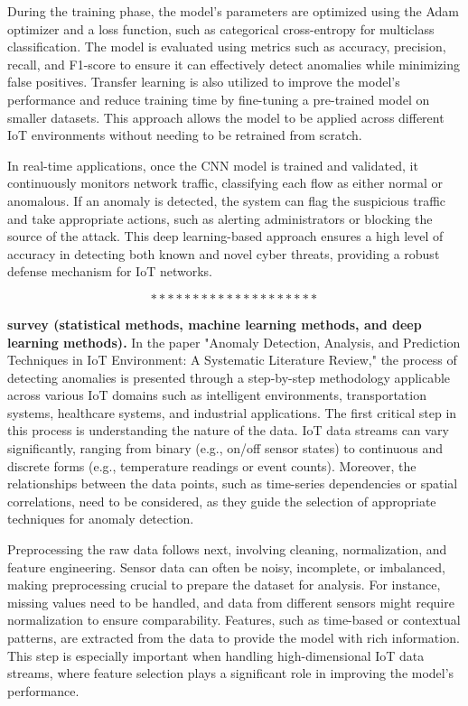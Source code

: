 During the training phase, the model's parameters are optimized using the Adam optimizer and a loss function, such as categorical cross-entropy for multiclass classification. The model is evaluated using metrics such as accuracy, precision, recall, and F1-score to ensure it can effectively detect anomalies while minimizing false positives. Transfer learning is also utilized to improve the model's performance and reduce training time by fine-tuning a pre-trained model on smaller datasets. This approach allows the model to be applied across different IoT environments without needing to be retrained from scratch.

In real-time applications, once the CNN model is trained and validated, it continuously monitors network traffic, classifying each flow as either normal or anomalous. If an anomaly is detected, the system can flag the suspicious traffic and take appropriate actions, such as alerting administrators or blocking the source of the attack. This deep learning-based approach ensures a high level of accuracy in detecting both known and novel cyber threats, providing a robust defense mechanism for IoT networks\cite{81}.

$$********************$$

\textbf{survey (statistical methods, machine learning methods, and deep learning methods).} In the paper "Anomaly Detection, Analysis, and Prediction Techniques in IoT Environment: A Systematic Literature Review," the process of detecting anomalies is presented through a step-by-step methodology applicable across various IoT domains such as intelligent environments, transportation systems, healthcare systems, and industrial applications. The first critical step in this process is understanding the nature of the data. IoT data streams can vary significantly, ranging from binary (e.g., on/off sensor states) to continuous and discrete forms (e.g., temperature readings or event counts). Moreover, the relationships between the data points, such as time-series dependencies or spatial correlations, need to be considered, as they guide the selection of appropriate techniques for anomaly detection.

Preprocessing the raw data follows next, involving cleaning, normalization, and feature engineering. Sensor data can often be noisy, incomplete, or imbalanced, making preprocessing crucial to prepare the dataset for analysis. For instance, missing values need to be handled, and data from different sensors might require normalization to ensure comparability. Features, such as time-based or contextual patterns, are extracted from the data to provide the model with rich information. This step is especially important when handling high-dimensional IoT data streams, where feature selection plays a significant role in improving the model's performance.

